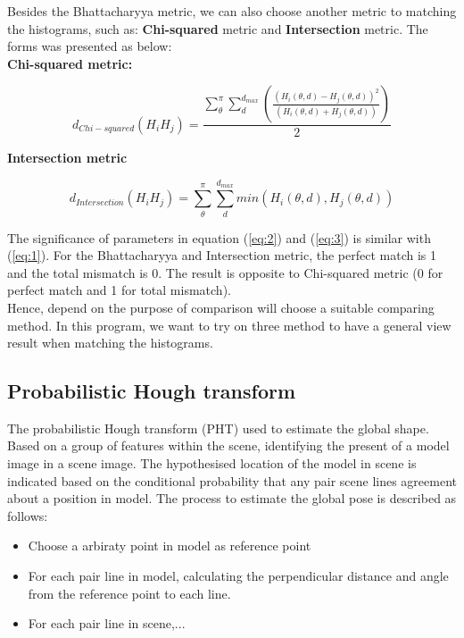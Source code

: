 Besides the Bhattacharyya metric, we can also choose another metric to matching the histograms, such as: \textbf{Chi-squared} metric and \textbf{Intersection} metric. The forms was presented as below:\\
\textbf{Chi-squared metric:}
\begin{center}
\begin{equation}\label{eq:2}
d_{Chi-squared} (H_{i}H_{j}) = \frac{\sum\limits_{\theta}^{\pi}\sum\limits_{d}^{d_{max}}(\frac{(H_{i}(\theta,d) - H_{j}(\theta,d))^{2}}{(H_{i}(\theta,d) + H_{j}(\theta,d))})}{2}
\end{equation}
\end{center}
\textbf{Intersection metric}
\begin{center}
\begin{equation}\label{eq:3}
d_{Intersection} (H_{i}H_{j}) = \sum\limits_{\theta}^{\pi}\sum\limits_{d}^{d_{max}}min(H_{i}(\theta,d), H_{j}(\theta,d))
\end{equation}
\end{center}
The significance of parameters in equation (\ref{eq:2}) and (\ref{eq:3}) is similar with (\ref{eq:1}). For the Bhattacharyya and Intersection metric, the perfect match is 1 and the total mismatch is 0. The result is opposite to Chi-squared metric (0 for perfect match and 1 for total mismatch).\\[0.2cm]
Hence, depend on the purpose of comparison will choose a suitable comparing method. In this program, we want to try on three method to have a general view result when matching the histograms.
\subsection{Probabilistic Hough transform}
The probabilistic Hough transform (PHT) used to estimate the global shape. Based on a group of features within the scene, identifying the present of a model image in a scene image. The hypothesised location of the model in scene is indicated based on the conditional probability that any pair scene lines agreement about a position in model. The process to estimate the global pose is described as follows:
\begin{itemize}
\item Choose a arbiraty point in model as reference point
\item For each pair line in model, calculating the perpendicular distance and angle from the reference point to each line.
\item For each pair line in scene,...
\end{itemize}
































